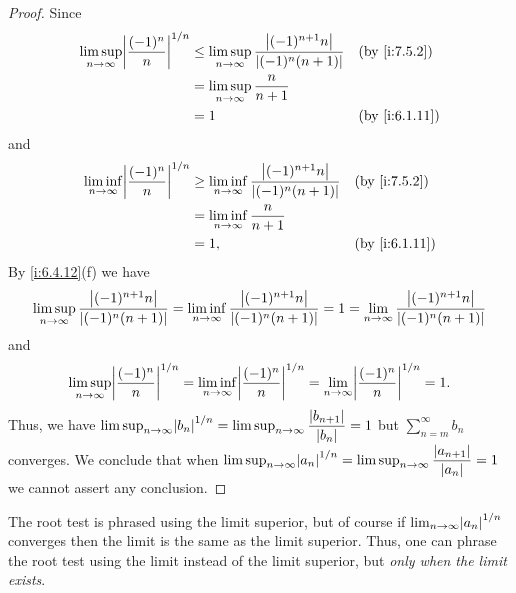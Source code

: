 \begin{proof}
  Since
  \begin{align*}
    \limsup_{n \to \infty} \abs{\dfrac{(-1)^n}{n}}^{1 / n} & \leq \limsup_{n \to \infty} \dfrac{\abs{(-1)^{n + 1} n}}{\abs{(-1)^n (n + 1)}} &  & \by{i:7.5.2}  \\
                                                           & = \limsup_{n \to \infty} \dfrac{n}{n + 1}                                                         \\
                                                           & = 1                                                                            &  & \by{i:6.1.11}
  \end{align*}
  and
  \begin{align*}
    \liminf_{n \to \infty} \abs{\dfrac{(-1)^n}{n}}^{1 / n} & \geq \liminf_{n \to \infty} \dfrac{\abs{(-1)^{n + 1} n}}{\abs{(-1)^n (n + 1)}} &  & \by{i:7.5.2}  \\
                                                           & = \liminf_{n \to \infty} \dfrac{n}{n + 1}                                                         \\
                                                           & = 1,                                                                           &  & \by{i:6.1.11}
  \end{align*}
  By \cref{i:6.4.12}(f) we have
  \[
    \limsup_{n \to \infty} \dfrac{\left\lvert(-1)^{n + 1} n\right\rvert}{\left\lvert(-1)^n (n + 1)\right\rvert} = \liminf_{n \to \infty} \dfrac{\left\lvert(-1)^{n + 1} n\right\rvert}{\left\lvert(-1)^n (n + 1)\right\rvert} = 1 = \lim_{n \to \infty} \dfrac{\left\lvert(-1)^{n + 1} n\right\rvert}{\left\lvert(-1)^n (n + 1)\right\rvert}
  \]
  and
  \[
    \limsup_{n \to \infty} \abs{\dfrac{(-1)^n}{n}}^{1 / n} = \liminf_{n \to \infty} \abs{\dfrac{(-1)^n}{n}}^{1 / n} = \lim_{n \to \infty} \abs{\dfrac{(-1)^n}{n}}^{1 / n} = 1.
  \]
  Thus, we have \(\limsup_{n \to \infty} \abs{b_n}^{1 / n} = \limsup_{n \to \infty} \dfrac{\abs{b_{n + 1}}}{\abs{b_n}} = 1\) but \(\sum_{n = m}^\infty b_n\) converges.
  We conclude that when \(\limsup_{n \to \infty} \abs{a_n}^{1 / n} = \limsup_{n \to \infty} \dfrac{\abs{a_{n + 1}}}{\abs{a_n}} = 1\) we cannot assert any conclusion.
\end{proof}

\begin{note}
  The root test is phrased using the limit superior, but of course if \(\lim_{n \to \infty} \abs{a_n}^{1 / n}\) converges then the limit is the same as the limit superior.
  Thus, one can phrase the root test using the limit instead of the limit superior, but \emph{only when the limit exists}.
\end{note}

